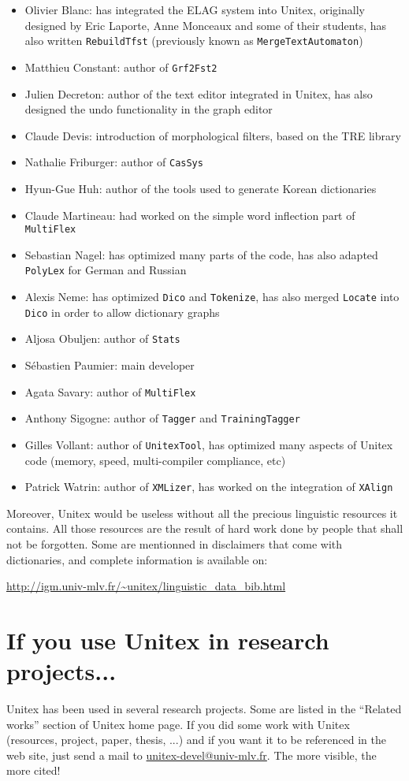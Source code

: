 \begin{itemize}
    \item Olivier Blanc: has integrated the ELAG system into Unitex, originally
    designed by Eric Laporte, Anne Monceaux and some of their students, has
    also written \verb+RebuildTfst+ (previously known as \verb+MergeTextAutomaton+)
    \item Matthieu Constant: author of \verb+Grf2Fst2+
    \item Julien Decreton: author of the text editor integrated in Unitex,
    has also designed the undo functionality in the graph editor
    \item Claude Devis: introduction of morphological filters, 
    based on the TRE library
    \item Nathalie Friburger: author of \verb+CasSys+
    \item Hyun-Gue Huh: author of the tools used to
    generate Korean dictionaries
    \item Claude Martineau: had worked on the simple word inflection part of
    \verb+MultiFlex+
    \item Sebastian Nagel: has optimized many parts of the code, has also
    adapted \verb+PolyLex+ for German and Russian
    \item Alexis Neme: has optimized \verb+Dico+ and \verb+Tokenize+, has also
    merged \verb+Locate+ into \verb+Dico+ in order to allow dictionary graphs 
    \item Aljosa Obuljen: author of \verb+Stats+
    \item S\'ebastien Paumier: main developer
    \item Agata Savary: author of \verb+MultiFlex+
    \item Anthony Sigogne: author of \verb+Tagger+ and \verb+TrainingTagger+
    \item Gilles Vollant: author of \verb+UnitexTool+, has optimized many
    aspects of Unitex code (memory, speed, multi-compiler compliance, etc)
    \item Patrick Watrin: author of \verb+XMLizer+, has worked on the
    integration of \verb+XAlign+
\end{itemize}

\bigskip
\noindent Moreover, Unitex would be useless without all the precious linguistic
resources it contains. All those resources are the result of hard work done
by people that shall not be forgotten. Some are mentionned in disclaimers that
come with dictionaries, and complete information is available on:

\bigskip
\noindent \url{http://igm.univ-mlv.fr/~unitex/linguistic_data_bib.html}


\section*{If you use Unitex in research projects...}
Unitex has been used in several research projects. Some are listed in the
``Related works'' section of Unitex home page. If you did some work with Unitex
(resources, project, paper, thesis, ...) and if you want it to be referenced in
the web site, just send a mail to \url{unitex-devel@univ-mlv.fr}. The more visible,
the more cited!
